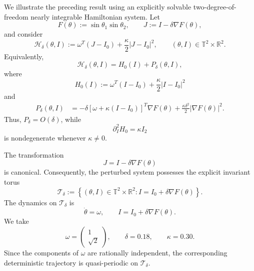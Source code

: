 \documentclass[preprint,12pt]{elsarticle}
\theoremstyle{definition}
\theoremstyle{plain}
\begin{document}
We illustrate the preceding result using an explicitly solvable
two-degree-of-freedom nearly integrable Hamiltonian system. Let
\begin{equation*}
    F(\theta)
    :=
    \sin\theta_1\sin\theta_2,
    \qquad
    J
    :=
    I-\delta\nabla F(\theta),
\end{equation*}
and consider
\begin{equation}
\label{eq:numerical-KAM-Hamiltonian}
    \mathscr H_\delta(\theta,I)
    :=
    \omega^T(J-I_0)
    +
    \frac{\kappa}{2}|J-I_0|^2,
    \qquad
    (\theta,I)\in\mathbb T^2\times\mathbb R^2.
\end{equation}
Equivalently,
\begin{equation*}
    \mathscr H_\delta(\theta,I)
    =
    H_0(I)+P_\delta(\theta,I),
\end{equation*}
where
\begin{equation*}
    H_0(I)
    :=
    \omega^T(I-I_0)
    +
    \frac{\kappa}{2}|I-I_0|^2
\end{equation*}
and
\begin{equation*}
\begin{aligned}
    P_\delta(\theta,I)
    &=
    -\delta
    \left[
        \omega+\kappa(I-I_0)
    \right]^T
    \nabla F(\theta)
    +
    \frac{\kappa\delta^2}{2}
    |\nabla F(\theta)|^2.
\end{aligned}
\end{equation*}
Thus, $P_\delta=O(\delta)$, while
\begin{equation*}
    \partial_I^2H_0=\kappa I_2
\end{equation*}
is nondegenerate whenever $\kappa\neq0$.

The transformation
\begin{equation*}
    J=I-\delta\nabla F(\theta)
\end{equation*}
is canonical. Consequently, the perturbed system possesses the
explicit invariant torus
\begin{equation}
\label{eq:explicit-deformed-KAM-torus}
    \mathcal T_\delta
    :=
    \left\{
        (\theta,I)\in\mathbb T^2\times\mathbb R^2:
        I=I_0+\delta\nabla F(\theta)
    \right\}.
\end{equation}
The dynamics on $\mathcal T_\delta$ is
\begin{equation*}
    \dot\theta=\omega,
    \qquad
    I=I_0+\delta\nabla F(\theta).
\end{equation*}
We take
\begin{equation*}
    \omega=
    \begin{pmatrix}
        1\\ \sqrt{2}
    \end{pmatrix},
    \qquad
    \delta=0.18,
    \qquad
    \kappa=0.30.
\end{equation*}
Since the components of $\omega$ are rationally independent, the
corresponding deterministic trajectory is quasi-periodic on
$\mathcal T_\delta$.
\end{document}
